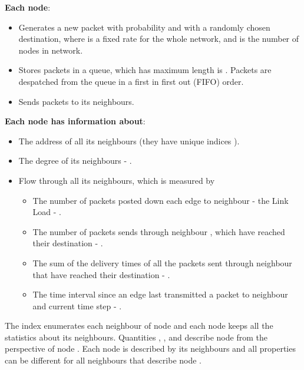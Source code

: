 \documentclass[runningheads]{llncs}
\begin{document}
\textbf{Each node}:
\begin{itemize}
  \item Generates a new packet with probability  and
  with a randomly chosen destination, where  is a fixed rate
  for the whole network, and  is the number of nodes in network.
  \item Stores packets in a queue, which has maximum length
  is . Packets are despatched from the queue in a first
  in first out (FIFO) order.
  \item Sends packets to its neighbours.
\end{itemize}

\textbf{Each node has information about}:
\begin{itemize}
  \item The address of all its
neighbours (they have unique indices ).
  \item The degree of its neighbours - .
  \item Flow through all its neighbours, which is measured by
\begin{itemize}
  \item The number of packets posted down each edge to neighbour  - the Link Load -  .
  \item  The number of packets sends through neighbour , which have reached their destination
  - .
  \item The sum of the delivery times of all the packets sent through neighbour  that have reached their
destination - .
\item The time interval since an edge last
transmitted a packet to neighbour  and current time step -
.
\end{itemize}

\end{itemize}

The index  enumerates each neighbour of node  and each node
keeps all the statistics about its neighbours. Quantities ,
,  and  describe node  from the
perspective of node . Each node is described by its neighbours
and all properties can be different for all neighbours that describe
node .
\end{document}
